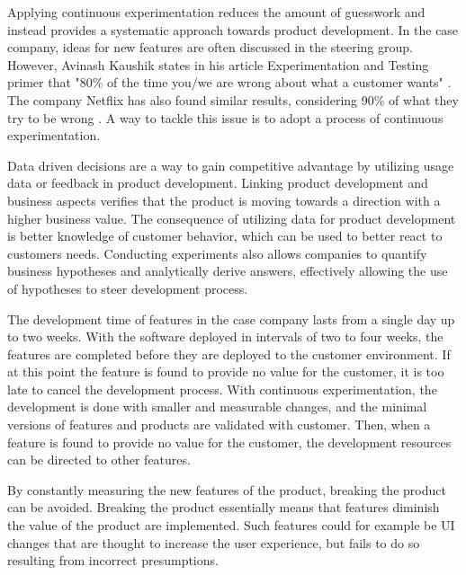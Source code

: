 \documentclass[english]{tktltiki2}
\theoremstyle{definition}
\theoremstyle{remark}
\begin{document}
Applying continuous experimentation reduces the amount of guesswork and instead provides a systematic approach towards product development. In the case company, ideas for new features are often discussed in the steering group. However, Avinash Kaushik states in his article Experimentation and Testing primer that "80\% of the time you/we are wrong about what a customer wants" \cite{kaushik}. The company Netflix has also found similar results, considering 90\% of what they try to be wrong \cite{moran2007wrong}. A way to tackle this issue is to adopt a process of continuous experimentation.

Data driven decisions are a way to gain competitive advantage by utilizing usage data or feedback in product development. Linking product development and business aspects verifies that the product is moving towards a direction with a higher business value. The consequence of utilizing data for product development is better knowledge of customer behavior, which can be used to better react to customers needs. Conducting experiments also allows companies to quantify business hypotheses and analytically derive answers, effectively allowing the use of hypotheses to steer development process.

The development time of features in the case company lasts from a single day up to two weeks. With the software deployed in intervals of two to four weeks, the features are completed before they are deployed to the customer environment. If at this point the feature is found to provide no value for the customer, it is too late to cancel the development process. With continuous experimentation, the development is done with smaller and measurable changes, and the minimal versions of features and products are validated with customer. Then, when a feature is found to provide no value for the customer, the development resources can be directed to other features.

By constantly measuring the new features of the product, breaking the product can be avoided. Breaking the product essentially means that features diminish the value of the product are implemented. Such features could for example be UI changes that are thought to increase the user experience, but fails to do so resulting from incorrect presumptions.
\end{document}
